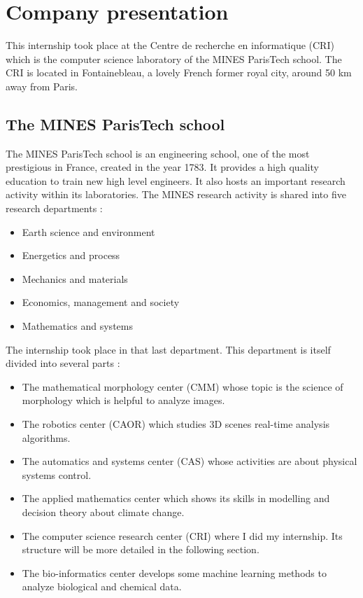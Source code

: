 \chapter{Company presentation}

This internship took place at the Centre de recherche en informatique (CRI) which is the computer science laboratory of the MINES ParisTech school. The CRI is located in Fontainebleau, a lovely French former royal city, around 50 km away from Paris.

\section{The MINES ParisTech school}
The MINES ParisTech school is an engineering school, one of the most prestigious in France, created in the year 1783. It provides a high quality education to train new high level engineers. It also hosts an important research activity within its laboratories. The MINES research activity is shared into five research departments : 
\begin{itemize}
    \item Earth science and environment
    \item Energetics and process
    \item Mechanics and materials
    \item Economics, management and society
    \item Mathematics and systems
\end{itemize}

The internship took place in that last department. This department is itself divided into several parts \cite{minesmaths} :
\begin{itemize}
    \item The mathematical morphology center (CMM) whose topic is the science of morphology which is helpful to analyze images.
    \item The robotics center (CAOR) which studies 3D scenes real-time analysis algorithms.
    \item The automatics and systems center (CAS) whose activities are about physical systems control.
    \item The applied mathematics center which shows its skills in modelling and decision theory about climate change.
    \item The computer science research center (CRI) where I did my internship. Its structure will be more detailed in the following section.
    \item The bio-informatics center develops some machine learning methods to analyze biological and chemical data.
\end{itemize}

